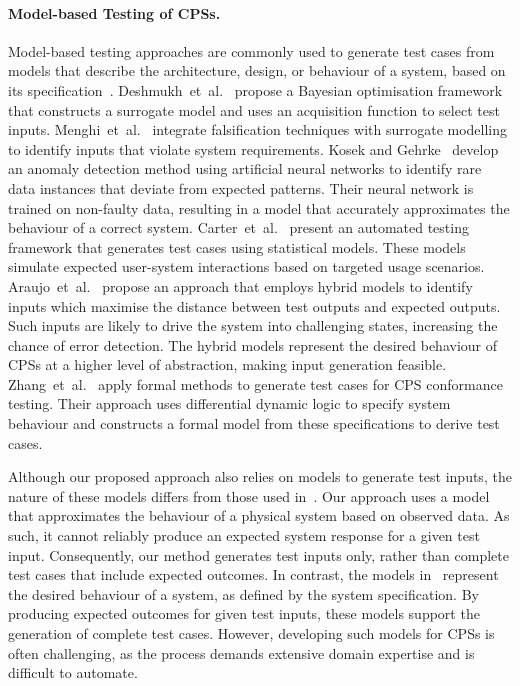 \documentclass[
]{ceurart}
\theoremstyle{definition}
\begin{document}
\paragraph{Model-based Testing of CPSs.}

Model-based testing approaches are commonly used to generate test cases from models that describe the architecture, design, or behaviour of a system, based on its specification~\cite{survey}. Deshmukh~et~al.~\cite{deshmukh} propose a Bayesian optimisation framework that constructs a surrogate model and uses an acquisition function to select test inputs. Menghi~et~al.~\cite{menghi} integrate falsification techniques with surrogate modelling to identify inputs that violate system requirements. Kosek and Gehrke~\cite{kosek} develop an anomaly detection method using artificial neural networks to identify rare data instances that deviate from expected patterns. Their neural network is trained on non-faulty data, resulting in a model that accurately approximates the behaviour of a correct system. Carter~et~al.~\cite{carter} present an automated testing framework that generates test cases using statistical models. These models simulate expected user-system interactions based on targeted usage scenarios. Araujo~et~al.~\cite{araujo} propose an approach that employs hybrid models to identify inputs which maximise the distance between test outputs and expected outputs. Such inputs are likely to drive the system into challenging states, increasing the chance of error detection. The hybrid models represent the desired behaviour of CPSs at a higher level of abstraction, making input generation feasible. Zhang~et~al.~\cite{zhang} apply formal methods to generate test cases for CPS conformance testing. Their approach uses differential dynamic logic to specify system behaviour and constructs a formal model from these specifications to derive test cases.

Although our proposed approach also relies on models to generate test inputs, the nature of these models differs from those used in~\cite{carter, araujo, zhang}. Our approach uses a model that approximates the behaviour of a physical system based on observed data. As such, it cannot reliably produce an expected system response for a given test input. Consequently, our method generates test inputs only, rather than complete test cases that include expected outcomes. In contrast, the models in~\cite{carter, araujo, zhang} represent the desired behaviour of a system, as defined by the system specification. By producing expected outcomes for given test inputs, these models support the generation of complete test cases. However, developing such models for CPSs is often challenging, as the process demands extensive domain expertise and is difficult to automate.
\end{document}

